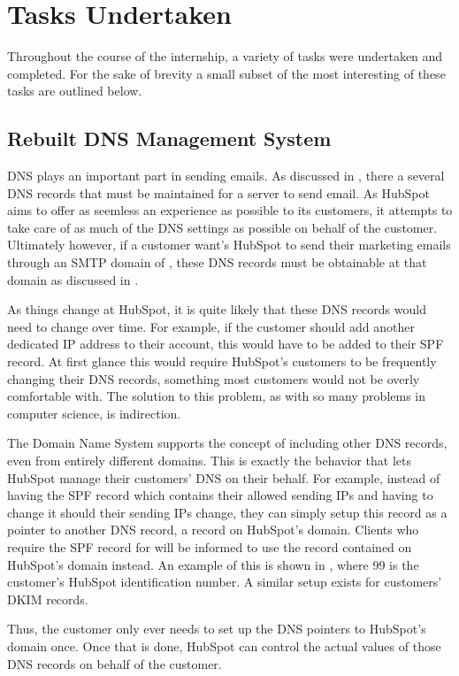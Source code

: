 \chapter{Tasks Undertaken}
Throughout the course of the internship, a variety of tasks were undertaken and completed.  
For the sake of brevity a small subset of the most interesting of these tasks are outlined below. 

\section{Rebuilt DNS Management System}
DNS plays an important part in sending emails. As discussed in , there a several DNS records that must be maintained for a server to send email. As HubSpot aims to offer as seemless an experience as possible to its customers, it attempts to take care of as much of the DNS settings as possible on behalf of the customer. Ultimately however, if a customer want's HubSpot to send their marketing emails through an SMTP domain of , these DNS records must be obtainable at that domain as discussed in . 

As things change at HubSpot, it is quite likely that these DNS records would need to change over time. For example, if the customer should add another dedicated IP address to their account, this would have to be added to their SPF record. At first glance this would require HubSpot's customers to be frequently changing their DNS records, something most customers would not be overly comfortable with. The solution to this problem, as with so many problems in computer science, is indirection. 

The Domain Name System supports the concept of including other DNS records, even from entirely different domains. This is exactly the behavior that lets HubSpot manage their customers' DNS on their behalf. For example, instead of  having the SPF record which contains their allowed sending IPs and having to change it should their sending IPs change, they can simply setup this record as a pointer to another DNS record, a record on HubSpot's domain. Clients who require the SPF record for  will be informed to use the record contained on HubSpot's domain instead. An example of this is shown in , where 99 is the customer's HubSpot identification number. A similar setup exists for customers' DKIM records.

Thus, the customer only ever needs to set up the DNS pointers to HubSpot's domain once. Once that is done, HubSpot can control the actual values of those DNS records on behalf of the customer. 

